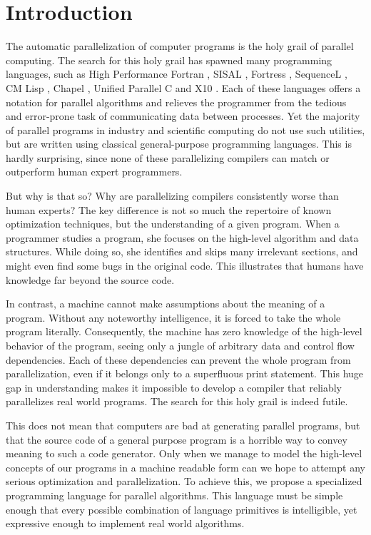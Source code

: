 \section{Introduction}
\label{sec:introduction}

The automatic parallelization of computer programs is the holy grail of
parallel computing. The search for this holy grail has spawned many
programming languages, such as High Performance Fortran \cite{HPF}, SISAL
\cite{SISAL}, Fortress \cite{Fortress}, SequenceL \cite{SequenceL}, CM Lisp
\cite{CM-Lisp}, Chapel \cite{Chapel}, Unified Parallel C \cite{UPC} and X10
\cite{X10}. Each of these languages offers a notation for parallel
algorithms and relieves the programmer from the tedious and error-prone
task of communicating data between processes. Yet the majority of parallel
programs in industry and scientific computing do not use such utilities,
but are written using classical general-purpose programming languages. This
is hardly surprising, since none of these parallelizing compilers can match
or outperform human expert programmers.

But why is that so? Why are parallelizing compilers consistently worse than
human experts? The key difference is not so much the repertoire of known
optimization techniques, but the understanding of a given program. When a
programmer studies a program, she focuses on the high-level algorithm and
data structures. While doing so, she identifies and skips many irrelevant
sections, and might even find some bugs in the original code. This
illustrates that humans have knowledge far beyond the source code.

In contrast, a machine cannot make assumptions about the meaning of a
program. Without any noteworthy intelligence, it is forced to take the
whole program literally. Consequently, the machine has zero knowledge of
the high-level behavior of the program, seeing only a jungle of arbitrary
data and control flow dependencies. Each of these dependencies can prevent
the whole program from parallelization, even if it belongs only to a
superfluous print statement. This huge gap in understanding makes it
impossible to develop a compiler that reliably parallelizes real world
programs. The search for this holy grail is indeed futile.

This does not mean that computers are bad at generating parallel programs,
but that the source code of a general purpose program is a horrible way to
convey meaning to such a code generator. Only when we manage to model the
high-level concepts of our programs in a machine readable form can we hope
to attempt any serious optimization and parallelization. To achieve this,
we propose a specialized programming language for parallel algorithms. This
language must be simple enough that every possible combination of language
primitives is intelligible, yet expressive enough to implement real world
algorithms.

